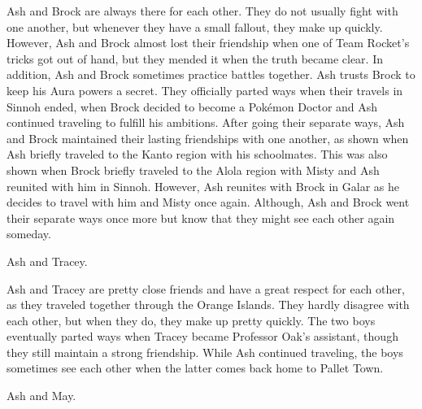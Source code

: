 \documentclass[a4paper,12pt]{article}
\begin{document}
Ash and Brock are always there for each other. They do not usually fight with one another, but whenever they have a small fallout, they make up quickly. However, Ash and Brock almost lost their friendship when one of Team Rocket's tricks got out of hand, but they mended it when the truth became clear. In addition, Ash and Brock sometimes practice battles together. Ash trusts Brock to keep his Aura powers a secret. They officially parted ways when their travels in Sinnoh ended, when Brock decided to become a Pokémon Doctor and Ash continued traveling to fulfill his ambitions. After going their separate ways, Ash and Brock maintained their lasting friendships with one another, as shown when Ash briefly traveled to the Kanto region with his schoolmates. This was also shown when Brock briefly traveled to the Alola region with Misty and Ash reunited with him in Sinnoh. However, Ash reunites with Brock in Galar as he decides to travel with him and Misty once again. Although, Ash and Brock went their separate ways once more but know that they might see each other again someday.\\ \par \vspace{0.5cm}

Ash and Tracey.\\ \par \vspace{0.5cm}

Ash and Tracey are pretty close friends and have a great respect for each other, as they traveled together through the Orange Islands. They hardly disagree with each other, but when they do, they make up pretty quickly. The two boys eventually parted ways when Tracey became Professor Oak's assistant, though they still maintain a strong friendship. While Ash continued traveling, the boys sometimes see each other when the latter comes back home to Pallet Town.\\ \par \vspace{0.5cm}

Ash and May.\\ \par \vspace{0.5cm}
\end{document}
